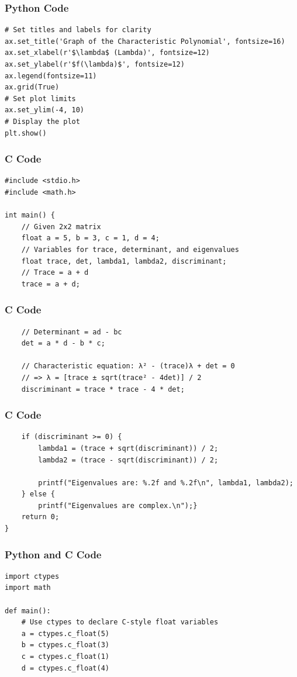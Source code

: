 \documentclass{beamer}
\begin{document}
\begin{frame}[fragile]
\frametitle{Python Code}
\begin{lstlisting}
# Set titles and labels for clarity
ax.set_title('Graph of the Characteristic Polynomial', fontsize=16)
ax.set_xlabel(r'$\lambda$ (Lambda)', fontsize=12)
ax.set_ylabel(r'$f(\lambda)$', fontsize=12)
ax.legend(fontsize=11)
ax.grid(True)
# Set plot limits
ax.set_ylim(-4, 10)
# Display the plot
plt.show()
\end{lstlisting}
\end{frame}

\begin{frame}[fragile]
\frametitle{C Code}
\begin{lstlisting}
#include <stdio.h>
#include <math.h>

int main() {
    // Given 2x2 matrix
    float a = 5, b = 3, c = 1, d = 4;    
    // Variables for trace, determinant, and eigenvalues
    float trace, det, lambda1, lambda2, discriminant;
    // Trace = a + d
    trace = a + d;
\end{lstlisting}
\end{frame}

\begin{frame}[fragile]
\frametitle{C Code}
\begin{lstlisting}
    // Determinant = ad - bc
    det = a * d - b * c;

    // Characteristic equation: λ² - (trace)λ + det = 0
    // => λ = [trace ± sqrt(trace² - 4det)] / 2
    discriminant = trace * trace - 4 * det;
\end{lstlisting}
\end{frame}

\begin{frame}[fragile]
\frametitle{C Code}
\begin{lstlisting}
    if (discriminant >= 0) {
        lambda1 = (trace + sqrt(discriminant)) / 2;
        lambda2 = (trace - sqrt(discriminant)) / 2;

        printf("Eigenvalues are: %.2f and %.2f\n", lambda1, lambda2);
    } else {
        printf("Eigenvalues are complex.\n");}
    return 0;
}
\end{lstlisting}
\end{frame}

\begin{frame}[fragile]
\frametitle{Python and C Code}
\begin{lstlisting}
import ctypes
import math

def main():
    # Use ctypes to declare C-style float variables
    a = ctypes.c_float(5)
    b = ctypes.c_float(3)
    c = ctypes.c_float(1)
    d = ctypes.c_float(4)
\end{lstlisting}
\end{frame}
\end{document}
